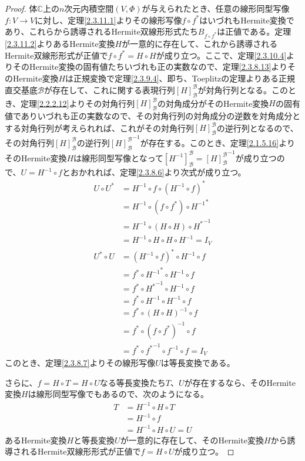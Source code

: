 \documentclass[dvipdfmx]{jsarticle}
\begin{document}
\begin{proof}
体$\mathbb{C}$上の$n$次元内積空間$(V,\varPhi)$が与えられたとき、任意の線形同型写像$f:V \rightarrow V$に対し、定理\ref{2.3.11.1}よりその線形写像$f \circ f^{*}$はいづれもHermite変換であり、これらから誘導されるHermite双線形形式たち$B_{f \circ f^{*}}$は正値である。定理\ref{2.3.11.2}よりあるHermite変換$H$が一意的に存在して、これから誘導されるHermite双線形形式が正値で$f \circ f^{*} = H \circ H$が成り立つ。ここで、定理\ref{2.3.10.4}よりそのHermite変換の固有値たちいづれも正の実数なので、定理\ref{2.3.8.13}よりそのHermite変換$H$は正規変換で定理\ref{2.3.9.4}、即ち、Toeplitzの定理よりある正規直交基底$\mathcal{B}$が存在して、これに関する表現行列$[ H]_{\mathcal{B}}^{\mathcal{B}}$が対角行列となる。このとき、定理\ref{2.2.2.12}よりその対角行列$[ H]_{\mathcal{B}}^{\mathcal{B}}$の対角成分がそのHermite変換$H$の固有値でありいづれも正の実数なので、その対角行列の対角成分の逆数を対角成分とする対角行列が考えられれば、これがその対角行列$[ H]_{\mathcal{B}}^{\mathcal{B}}$の逆行列となるので、その対角行列$[ H]_{\mathcal{B}}^{\mathcal{B}}$の逆行列${[ H]_{\mathcal{B}}^{\mathcal{B}}}^{- 1}$が存在する。このとき、定理\ref{2.1.5.16}よりそのHermite変換$H$は線形同型写像となって$\left[ H^{- 1} \right]_{\mathcal{B}}^{\mathcal{B}} = {[ H]_{\mathcal{B}}^{\mathcal{B}}}^{- 1}$が成り立つので、$U = H^{- 1} \circ f$とおかれれば、定理\ref{2.3.8.6}より次式が成り立つ。
\begin{align*}
U \circ U^{*} &= H^{- 1} \circ f \circ \left( H^{- 1} \circ f \right)^{*}\\
&= H^{- 1} \circ \left( f \circ f^{*} \right) \circ {H^{- 1}}^{*}\\
&= H^{- 1} \circ (H \circ H) \circ {H^{*}}^{- 1}\\
&= H^{- 1} \circ H \circ H \circ H^{- 1} = I_{V}\\
U^{*} \circ U &= \left( H^{- 1} \circ f \right)^{*} \circ H^{- 1} \circ f\\
&= f^{*} \circ {H^{- 1}}^{*} \circ H^{- 1} \circ f\\
&= f^{*} \circ {H^{*}}^{- 1} \circ H^{- 1} \circ f\\
&= f^{*} \circ H^{- 1} \circ H^{- 1} \circ f\\
&= f^{*} \circ (H \circ H)^{- 1} \circ f\\
&= f^{*} \circ \left( f \circ f^{*} \right)^{- 1} \circ f\\
&= f^{*} \circ {f^{*}}^{- 1} \circ f^{- 1} \circ f = I_{V}
\end{align*}
このとき、定理\ref{2.3.8.7}よりその線形写像$U$は等長変換である。\par
さらに、$f = H \circ T = H \circ U$なる等長変換たち$T$、$U$が存在するなら、そのHermite変換$H$は線形同型写像でもあるので、次のようになる。
\begin{align*}
T &= H^{- 1} \circ H \circ T\\
&= H^{- 1} \circ f\\
&= H^{- 1} \circ H \circ U = U
\end{align*}
あるHermite変換$H$と等長変換$U$が一意的に存在して、そのHermite変換$H$から誘導されるHermite双線形形式が正値で$f = H \circ U$が成り立つ。
\end{proof}
\end{document}
